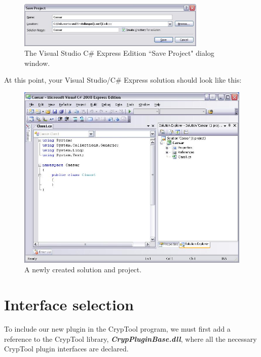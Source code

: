 \begin{figure}[h!]
	\centering
		\includegraphics[width=0.80\textwidth]{figures/save_solution_csharp_express.JPG}
	\caption{The Visual Studio C\# Express Edition ``Save Project" dialog window.}
	\label{fig:save_solution_csharp_express}
\end{figure}

\noindent At this point, your Visual Studio\slash C\# Express solution should look like this:

\begin{figure}[h!]
	\centering
		\includegraphics[width=1.00\textwidth]{figures/solution_start_up.jpg}
	\caption{A newly created solution and project.}
	\label{fig:solution_start_up}
\end{figure}
\clearpage

\section{Interface selection}
\label{sec:InterfaceSelection}

To include our new plugin in the CrypTool program, we must first add a reference to the CrypTool library, \textbf{\textit{CrypPluginBase.dll}}, where all the necessary CrypTool plugin interfaces are declared.

